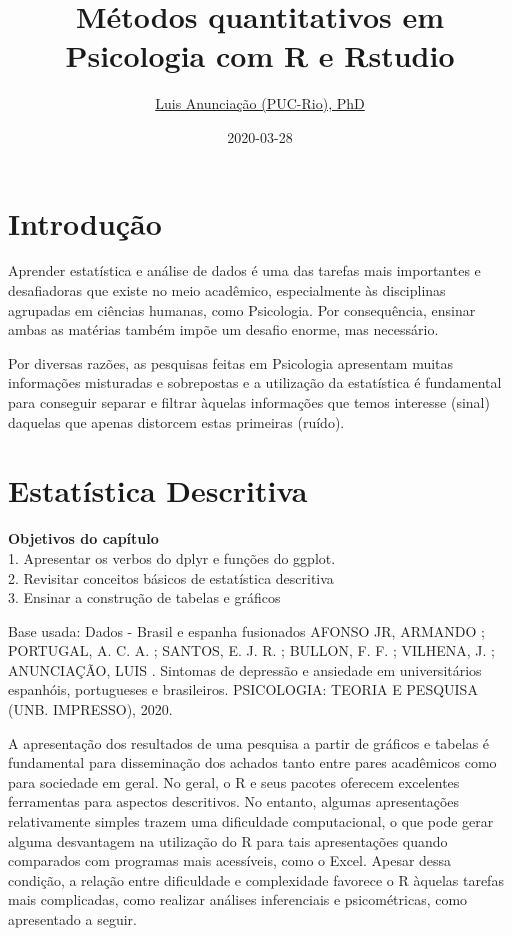 \documentclass[
]{book}
\title{Métodos quantitativos em Psicologia com R e Rstudio}
\author{\href{mailto:\%20luisfca@gmail.com}{Luis Anunciação (PUC-Rio), PhD}}
\date{2020-03-28}
\begin{document}
\maketitle

{
\setcounter{tocdepth}{1}
\tableofcontents
}
\hypertarget{introduuxe7uxe3o}{%
\chapter{Introdução}\label{introduuxe7uxe3o}}

Aprender estatística e análise de dados é uma das tarefas mais importantes e desafiadoras que existe no meio acadêmico, especialmente às disciplinas agrupadas em ciências humanas, como Psicologia. Por consequência, ensinar ambas as matérias também impõe um desafio enorme, mas necessário.

Por diversas razões, as pesquisas feitas em Psicologia apresentam muitas informações misturadas e sobrepostas e a utilização da estatística é fundamental para conseguir separar e filtrar àquelas informações que temos interesse (sinal) daquelas que apenas distorcem estas primeiras (ruído).

\hypertarget{estatuxedstica-descritiva}{%
\chapter{Estatística Descritiva}\label{estatuxedstica-descritiva}}

\begin{objectives}
\textbf{Objetivos do capítulo}\\
1. Apresentar os verbos do dplyr e funções do ggplot.\\
2. Revisitar conceitos básicos de estatística descritiva\\
3. Ensinar a construção de tabelas e gráficos
\end{objectives}

Base usada: Dados - Brasil e espanha fusionados
AFONSO JR, ARMANDO ; PORTUGAL, A. C. A. ; SANTOS, E. J. R. ; BULLON, F. F. ; VILHENA, J. ; ANUNCIAÇÃO, LUIS . Sintomas de depressão e ansiedade em universitários espanhóis, portugueses e brasileiros. PSICOLOGIA: TEORIA E PESQUISA (UNB. IMPRESSO), 2020.

A apresentação dos resultados de uma pesquisa a partir de gráficos e tabelas é fundamental para disseminação dos achados tanto entre pares acadêmicos como para sociedade em geral. No geral, o R e seus pacotes oferecem excelentes ferramentas para aspectos descritivos. No entanto, algumas apresentações relativamente simples trazem uma dificuldade computacional, o que pode gerar alguma desvantagem na utilização do R para tais apresentações quando comparados com programas mais acessíveis, como o Excel. Apesar dessa condição, a relação entre dificuldade e complexidade favorece o R àquelas tarefas mais complicadas, como realizar análises inferenciais e psicométricas, como apresentado a seguir.
\end{document}
